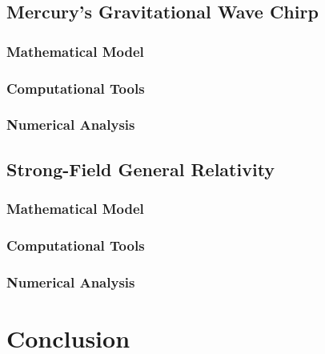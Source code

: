 \documentclass{report}
\begin{document}
    \section{Mercury's Gravitational Wave Chirp}

        \subsection{Mathematical Model}

        \subsection{Computational Tools}

        \subsection{Numerical Analysis}

    \section{Strong-Field General Relativity}

        \subsection{Mathematical Model}

        \subsection{Computational Tools}

        \subsection{Numerical Analysis}

\chapter{Conclusion}

\printbibliography

\printindex
\end{document}
